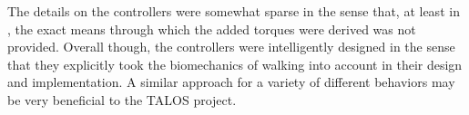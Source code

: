  The details on the controllers were somewhat sparse in the sense that, at least in \cite{}, the exact means through which the added torques were derived was not provided.  Overall though, the controllers were intelligently designed in the sense that they explicitly took the biomechanics of walking into account in their design and implementation.  A similar approach for a variety of different behaviors may be very beneficial to the TALOS project.  
 
% 



